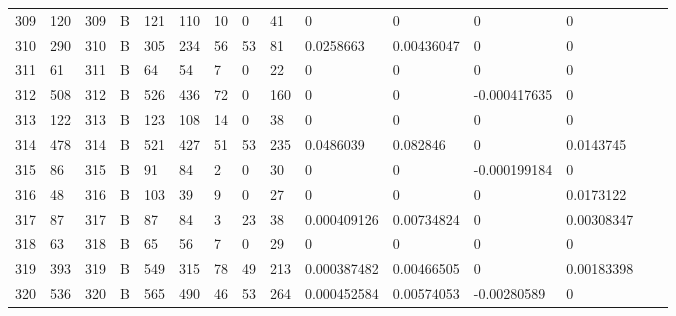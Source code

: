 \begin{longtable}{lllllllllllllll}
	309 & 120               & 309 & B   & 121               & 110               & 10                & 0    & 41         & 0              & 0              & 0             & 0            \\
	310 & 290               & 310 & B   & 305               & 234               & 56                & 53   & 81         & 0.0258663      & 0.00436047     & 0             & 0            \\
	311 & 61                & 311 & B   & 64                & 54                & 7                 & 0    & 22         & 0              & 0              & 0             & 0            \\
	312 & 508               & 312 & B   & 526               & 436               & 72                & 0    & 160        & 0              & 0              & -0.000417635  & 0            \\
	313 & 122               & 313 & B   & 123               & 108               & 14                & 0    & 38         & 0              & 0              & 0             & 0            \\
	314 & 478               & 314 & B   & 521               & 427               & 51                & 53   & 235        & 0.0486039      & 0.082846       & 0             & 0.0143745    \\
	315 & 86                & 315 & B   & 91                & 84                & 2                 & 0    & 30         & 0              & 0              & -0.000199184  & 0            \\
	316 & 48                & 316 & B   & 103               & 39                & 9                 & 0    & 27         & 0              & 0              & 0             & 0.0173122    \\
	317 & 87                & 317 & B   & 87                & 84                & 3                 & 23   & 38         & 0.000409126    & 0.00734824     & 0             & 0.00308347   \\
	318 & 63                & 318 & B   & 65                & 56                & 7                 & 0    & 29         & 0              & 0              & 0             & 0            \\
	319 & 393               & 319 & B   & 549               & 315               & 78                & 49   & 213        & 0.000387482    & 0.00466505     & 0             & 0.00183398   \\
	320 & 536               & 320 & B   & 565               & 490               & 46                & 53   & 264        & 0.000452584    & 0.00574053     & -0.00280589   & 0            \\

\end{longtable}
